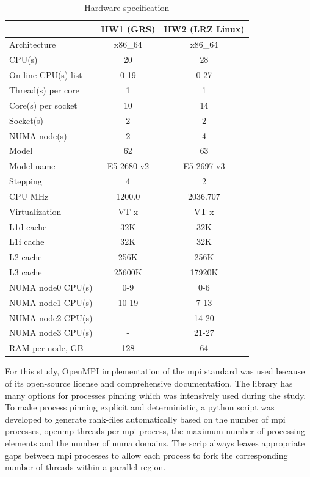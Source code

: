 \begin{table}
\centering
\small
\begin{tabular}{|l|c|c|}
\hline
                    & HW1 (GRS) & HW2 (LRZ Linux) \\ \hline
Architecture        & x86\_64 & x86\_64 \\ \hline
CPU(s)              & 20 &  28 \\ \hline
On-line CPU(s) list & 0-19 &  0-27 \\ \hline
Thread(s) per core  & 1 &  1 \\  \hline
Core(s) per socket  & 10 & 14 \\ \hline
Socket(s)           & 2 &  2 \\ \hline
NUMA node(s)        & 2 &  4 \\ \hline
Model               & 62 &  63 \\ \hline
Model name          & E5-2680 v2 & 
E5-2697 v3 \\ \hline
Stepping            & 4 &  2 \\ \hline
CPU MHz             & 1200.0 &  2036.707 \\ \hline
Virtualization      & VT-x &  VT-x \\ \hline
L1d cache           & 32K &  32K \\ \hline
L1i cache           & 32K &  32K \\ \hline
L2 cache            & 256K &  256K \\ \hline
L3 cache            & 25600K &  17920K \\ \hline
NUMA node0 CPU(s)   & 0-9 &  0-6 \\ \hline
NUMA node1 CPU(s)   & 10-19 &  7-13 \\ \hline
NUMA node2 CPU(s)   & - &  14-20 \\ \hline
NUMA node3 CPU(s)   & - &  21-27 \\ \hline
RAM per node, GB   & 128 &  64 \\ \hline
\end{tabular}
\caption{Hardware specification}
\label{table:hardware-spec}
\end{table}


For this study, OpenMPI implementation of the \gls{mpi} standard was used because of its open-source license and comprehensive documentation. The library has many options for processes pinning which was intensively used during the study.\\


To make process pinning explicit and deterministic, a python script was developed to generate rank-files automatically based on the number of \gls{mpi} processes, \gls{openmp} threads per \gls{mpi} process, the maximum number of processing elements and the number of \gls{numa} domains. The scrip always leaves appropriate gaps between \gls{mpi} processes to allow each process to fork the corresponding number of threads within a parallel region.\\


